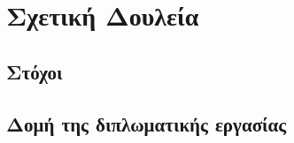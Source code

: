 \chapter{Σχετική Δουλεία}
\label{ch:relativeWork}


\section{Στόχοι}

\section{Δομή της διπλωματικής εργασίας}
